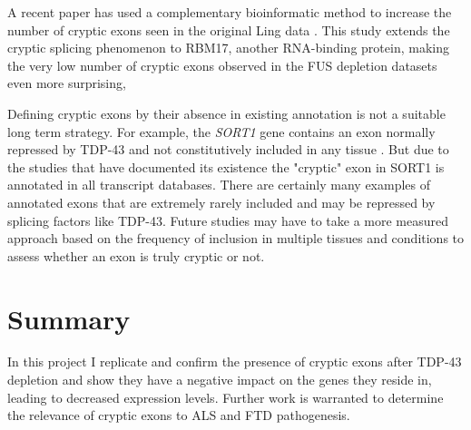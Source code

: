 A recent paper has used a complementary bioinformatic method to increase the number of cryptic exons seen in the original Ling data \citep{Tan07102016}. This study extends the cryptic splicing phenomenon to RBM17, another RNA-binding protein, making the very low number of cryptic exons observed in the FUS depletion datasets even more surprising,

Defining cryptic exons by their absence in existing annotation is not a suitable long term strategy. For example, the \textit{SORT1} gene contains an exon normally repressed by TDP-43 and not constitutively included in any tissue \citep{Prudencio2012}. But due to the studies that have documented its existence the "cryptic" exon in SORT1 is annotated in all transcript databases. There are certainly many examples of annotated exons that are extremely rarely included and may be repressed by splicing factors like TDP-43. Future studies may have to take a more measured approach based on the frequency of inclusion in multiple tissues and conditions to assess whether an exon is truly cryptic or not.


\section{Summary}
In this project I replicate and confirm the presence of cryptic exons after TDP-43 depletion and show they have a negative impact on the genes they reside in, leading to decreased expression levels. Further work is warranted to determine the relevance of cryptic exons to ALS and FTD pathogenesis.


